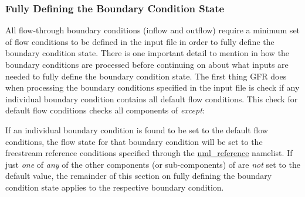 
\subsubsection{Fully Defining the Boundary Condition State}
\label{SEC:BC:Specify:FullState}

All flow-through boundary conditions (\thatis inflow and outflow) require a
minimum set of flow conditions to be defined in the input file in order to fully
define the boundary condition state.
%
There is one important detail to mention in how the boundary conditions are
processed before continuing on about what inputs are needed to fully define the
boundary condition state.
%
The first thing GFR does when processing the boundary conditions specified in
the input file is check if any individual boundary condition contains
all default flow conditions.
%
This check for default flow conditions checks all components of
\emph{except}:
%
\begin{InputExample}
  \item[\BCinptext{Name}]
  \item[\BCinptext{Set\_BC\_Value}]
  \item[\BCinptext{Periodic\%\ldots}]
\end{InputExample}
%
If an individual boundary condition is found to be set to the default flow
conditions, the flow state for that boundary condition will be set to the
freestream reference conditions specified through the
\hyperref[LST:nml_reference]{nml\_reference} namelist.
%
If just \emph{one} of \emph{any} of the other components (or sub-components) of
\BCinptext{} are \emph{not} set to the default value, the remainder of this
section on fully defining the boundary condition state applies to the
respective boundary condition.



